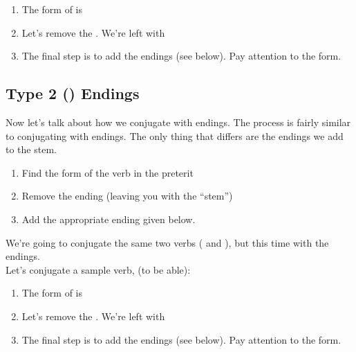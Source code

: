 \begin{enumerate}[noitemsep]
	\item The  form of  is 
	\item Let's remove the . We're left with 
	\item The final step is to add the endings (see below). Pay attention to the  form. 
\end{enumerate}


\subsection{Type 2 () Endings}

Now let's talk about how we conjugate with  endings. The process is fairly similar to conjugating with  endings. The only thing that differs are the endings we add to the stem. \\

\begin{enumerate}[noitemsep]
	\item Find the  form of the verb in the preterit
	\item Remove the  ending (leaving you with the ``stem'')
	\item Add the appropriate ending given below. 
\end{enumerate}



We're going to conjugate the same two verbs ( and ), but this time with the  endings. \\

Let's conjugate a sample verb,  (to be able):
\begin{enumerate}[noitemsep]
	\item The  form of  is 
	\item Let's remove the . We're left with 
	\item The final step is to add the endings (see below). Pay attention to the  form. 
\end{enumerate}

